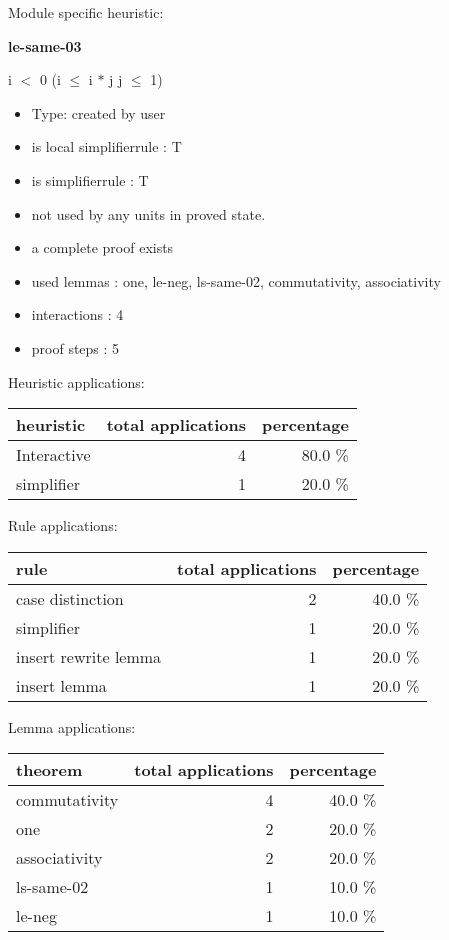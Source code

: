 \documentclass[a4paper]{article}
\begin{document}
Module specific heuristic:

\pagebreak

{\LARGE\bf le-same-03}\label{lemma-le-same-03}

\medskip

 \Fol i $<$ 0 \Imp (i $\le$ i $*$ j \Equiv j $\le$ 1)

\begin{itemize}

\item Type: created by user

\item is local simplifierrule : T
\item is simplifierrule : T
\item not used by any units in proved state.
\item       a complete proof exists
\item       used lemmas  : one, le-neg, ls-same-02, commutativity, associativity
\item       interactions : 4
\item       proof steps  : 5
\end{itemize}

\medskip


Heuristic applications:

\begin{supertabular}{l|r|r}
heuristic	& total applications & percentage \\ \hline
Interactive & 4 & 80.0 \% \\
simplifier & 1 & 20.0 \% \\

\end{supertabular}

Rule applications:

\begin{supertabular}{l|r|r}
rule	        & total applications & percentage \\ \hline
case distinction & 2 & 40.0 \% \\
simplifier & 1 & 20.0 \% \\
insert rewrite lemma & 1 & 20.0 \% \\
insert lemma & 1 & 20.0 \% \\

\end{supertabular}

Lemma applications:

\begin{supertabular}{l|r|r}
theorem	        & total applications & percentage \\ \hline
commutativity & 4 & 40.0 \% \\
one & 2 & 20.0 \% \\
associativity & 2 & 20.0 \% \\
ls-same-02 & 1 & 10.0 \% \\
le-neg & 1 & 10.0 \% \\

\end{supertabular}
\end{document}
